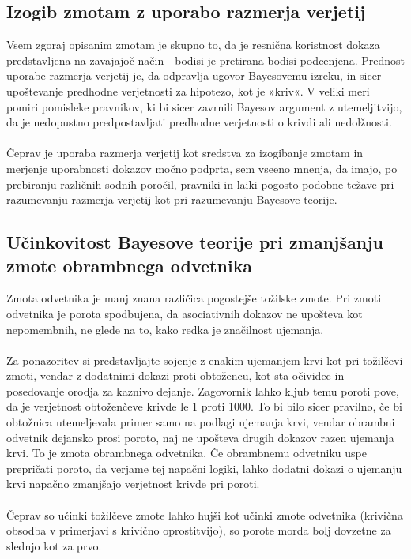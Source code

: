 \documentclass[fin1, tisk]{fmfdelo}
\theoremstyle{definition}
\theoremstyle{trditev}
\theoremstyle{izrek}
\begin{document}
\subsection{Izogib zmotam z uporabo razmerja verjetij}
Vsem zgoraj opisanim zmotam je skupno to, da je resnična koristnost dokaza predstavljena na zavajajoč način - bodisi je pretirana bodisi podcenjena.
Prednost uporabe razmerja verjetij je, da odpravlja ugovor Bayesovemu izreku, in sicer upoštevanje predhodne verjetnosti za hipotezo,
kot je »kriv«. V veliki meri pomiri pomisleke pravnikov, ki bi sicer zavrnili Bayesov argument z utemeljitvijo, da je nedopustno predpostavljati 
predhodne verjetnosti o krivdi ali nedolžnosti.\\\\
Čeprav je uporaba razmerja verjetij kot sredstva za izogibanje zmotam in merjenje uporabnosti dokazov močno podprta, sem vseeno mnenja, da
imajo, po prebiranju različnih sodnih poročil, pravniki in laiki pogosto podobne težave pri razumevanju razmerja verjetij kot pri razumevanju
Bayesove teorije.

\subsection{Učinkovitost Bayesove teorije pri zmanjšanju zmote obrambnega odvetnika}
Zmota odvetnika je manj znana različica pogostejše tožilske zmote. Pri zmoti odvetnika je porota spodbujena, da asociativnih dokazov ne upošteva 
kot nepomembnih, ne glede na to, kako redka je značilnost ujemanja.\\\\
Za ponazoritev si predstavljajte sojenje z enakim ujemanjem krvi kot pri tožilčevi zmoti, vendar z dodatnimi dokazi proti obtožencu, kot sta 
očividec in posedovanje orodja za kaznivo dejanje. Zagovornik lahko kljub temu poroti pove, da je verjetnost obtoženčeve krivde le 1 proti 1000. 
To bi bilo sicer pravilno, če bi obtožnica utemeljevala primer samo na podlagi ujemanja krvi, vendar obrambni odvetnik dejansko prosi poroto, 
naj ne upošteva drugih dokazov razen ujemanja krvi. To je zmota obrambnega odvetnika. Če obrambnemu odvetniku uspe prepričati poroto, da verjame 
tej napačni logiki, lahko dodatni dokazi o ujemanju krvi napačno zmanjšajo verjetnost krivde pri poroti.\\\\
Čeprav so učinki tožilčeve zmote lahko hujši kot učinki zmote odvetnika (krivična obsodba v primerjavi s krivično oprostitvijo), so porote morda 
bolj dovzetne za slednjo kot za prvo.
\end{document}
